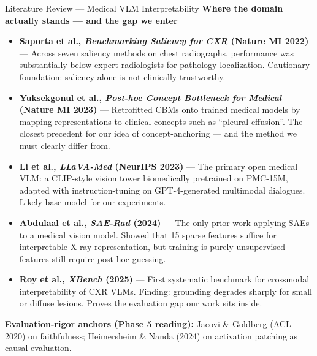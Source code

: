 \documentclass[aspectratio=169,11pt]{beamer}
\begin{document}
\begin{frame}{Literature Review --- Medical VLM Interpretability}
    \textbf{Where the domain actually stands --- and the gap we enter}

    \vspace{0.3em}
    \small
    \begin{itemize}
        \item \textbf{Saporta et al., \textit{Benchmarking Saliency for CXR} (Nature MI 2022)} --- Across seven saliency methods on chest radiographs, performance was substantially below expert radiologists for pathology localization. Cautionary foundation: saliency alone is not clinically trustworthy.

        \item \textbf{Yuksekgonul et al., \textit{Post-hoc Concept Bottleneck for Medical} (Nature MI 2023)} --- Retrofitted CBMs onto trained medical models by mapping representations to clinical concepts such as ``pleural effusion''. The closest precedent for our idea of concept-anchoring --- and the method we must clearly differ from.

        \item \textbf{Li et al., \textit{LLaVA-Med} (NeurIPS 2023)} --- The primary open medical VLM: a CLIP-style vision tower biomedically pretrained on PMC-15M, adapted with instruction-tuning on GPT-4-generated multimodal dialogues. Likely base model for our experiments.

        \item \textbf{Abdulaal et al., \textit{SAE-Rad} (2024)} --- The only prior work applying SAEs to a medical vision model. Showed that 15 sparse features suffice for interpretable X-ray representation, but training is purely unsupervised --- features still require post-hoc guessing.

        \item \textbf{Roy et al., \textit{XBench} (2025)} --- First systematic benchmark for crossmodal interpretability of CXR VLMs. Finding: grounding degrades sharply for small or diffuse lesions. Proves the evaluation gap our work sits inside.
    \end{itemize}

    \vspace{0.3em}
    \textbf{Evaluation-rigor anchors (Phase 5 reading):} Jacovi \& Goldberg (ACL 2020) on faithfulness; Heimersheim \& Nanda (2024) on activation patching as causal evaluation.
\end{frame}
\end{document}
